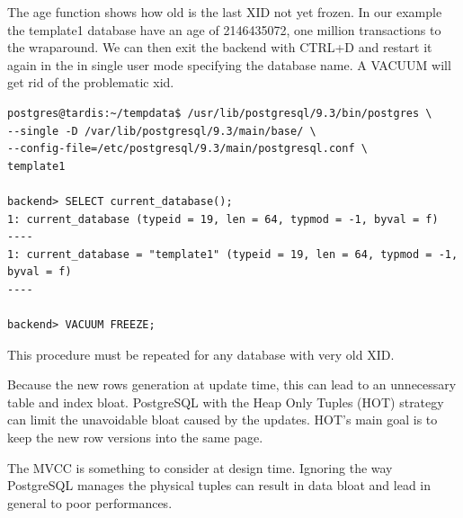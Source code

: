 The age function shows how old is the last XID not yet frozen. In our example the template1
database have an age of 2146435072, one million transactions to the wraparound. We can then exit 
the backend with CTRL+D and restart it again in the in single user mode specifying the database 
name. A VACUUM will get rid of the problematic xid.

\begin{verbatim}
postgres@tardis:~/tempdata$ /usr/lib/postgresql/9.3/bin/postgres \
--single -D /var/lib/postgresql/9.3/main/base/ \
--config-file=/etc/postgresql/9.3/main/postgresql.conf \
template1
                                
backend> SELECT current_database();
1: current_database (typeid = 19, len = 64, typmod = -1, byval = f)
----
1: current_database = "template1" (typeid = 19, len = 64, typmod = -1, byval = f)
----

backend> VACUUM FREEZE;
\end{verbatim}

This procedure must be repeated for any database with very old XID.\newline

Because the new rows generation at update time, this can lead to an unnecessary table and index bloat.
PostgreSQL with the Heap Only Tuples (HOT)\index{HOT strategy} strategy can limit the unavoidable bloat 
caused by the updates. HOT's main goal is to keep the new row versions into the same page. 

The MVCC is something to consider at design time. Ignoring the way PostgreSQL manages the physical tuples 
can result in data bloat and lead in general to poor performances.
